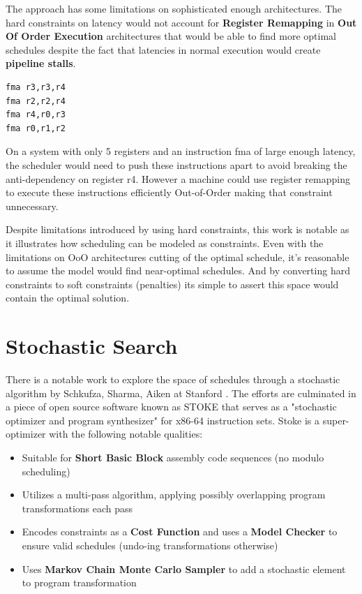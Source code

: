 \documentclass[12pt]{report}
\def\mytitle{??? Program Code ???}
\begin{document}
The approach has some limitations on sophisticated enough architectures. The
hard constraints on latency would not account for \textbf{Register Remapping} in
\textbf{Out Of Order Execution} architectures that would be able to find more
optimal schedules despite the fact that latencies in normal execution would
create \textbf{pipeline stalls}.

\def\mytitle{{\sc Assembly Code Example Requiring Register Renaming for Optimal Scheduling \hspace{12em} \color{grey}{.} }}
\begin{verbatim}
fma r3,r3,r4
fma r2,r2,r4
fma r4,r0,r3
fma r0,r1,r2
\end{verbatim}
On a system with only 5 registers and an instruction fma of large enough
latency, the scheduler would need to push these instructions apart to avoid
breaking the anti-dependency on register r4. However a machine
could use register remapping to execute these instructions efficiently Out-of-Order
making that constraint unnecessary. 

Despite limitations introduced by using hard constraints, this work is
notable as it illustrates how scheduling can be modeled as constraints. Even
with the limitations on OoO architectures cutting of the optimal schedule,
it's reasonable to assume the model would find near-optimal schedules. And by
converting hard constraints to soft constraints (penalties) its simple to
assert this space would contain the optimal solution.

\section{Stochastic Search}
\label{sec:org1078b4b}
There is a notable work to explore the space of schedules through a
stochastic algorithm by Schkufza, Sharma, Aiken at Stanford
\parencite{Schkufza:2016:SPO:2886013.2863701}. The efforts are culminated in
a piece of open source software known as STOKE that serves as a "stochastic
optimizer and program synthesizer" for x86-64 instruction sets. Stoke is a
super-optimizer with the following notable qualities:

\begin{itemize}
\item Suitable for \textbf{Short Basic Block} assembly code sequences (no modulo scheduling)
\item Utilizes a multi-pass algorithm, applying possibly overlapping program
transformations each pass
\item Encodes constraints as a \textbf{Cost Function} and uses a \textbf{Model Checker} to
ensure valid schedules (undo-ing transformations otherwise)
\item Uses \textbf{Markov Chain Monte Carlo Sampler} to add a stochastic element to
program transformation
\end{itemize}
\end{document}
